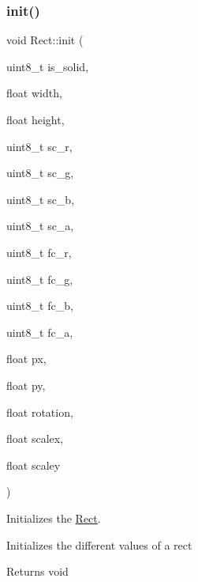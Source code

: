 \subsubsection{\texorpdfstring{init()}{init()}}
{\footnotesize\ttfamily void Rect\+::init (\begin{DoxyParamCaption}\item[{uint8\+\_\+t}]{is\+\_\+solid,  }\item[{float}]{width,  }\item[{float}]{height,  }\item[{uint8\+\_\+t}]{sc\+\_\+r,  }\item[{uint8\+\_\+t}]{sc\+\_\+g,  }\item[{uint8\+\_\+t}]{sc\+\_\+b,  }\item[{uint8\+\_\+t}]{sc\+\_\+a,  }\item[{uint8\+\_\+t}]{fc\+\_\+r,  }\item[{uint8\+\_\+t}]{fc\+\_\+g,  }\item[{uint8\+\_\+t}]{fc\+\_\+b,  }\item[{uint8\+\_\+t}]{fc\+\_\+a,  }\item[{float}]{px,  }\item[{float}]{py,  }\item[{float}]{rotation,  }\item[{float}]{scalex,  }\item[{float}]{scaley }\end{DoxyParamCaption})}



Initializes the \hyperlink{class_rect}{Rect}. 

Initializes the different values of a rect

\begin{DoxyReturn}{Returns}
void 
\end{DoxyReturn}


